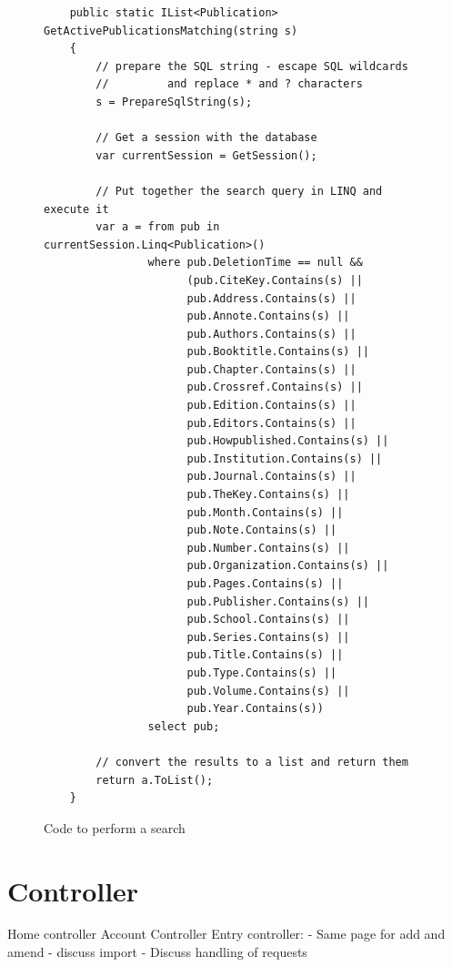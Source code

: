 \begin{figure}
	\begin{center}
			\lstset{language=CSharp} 
			\begin{lstlisting}
	public static IList<Publication> GetActivePublicationsMatching(string s)
	{
	    // prepare the SQL string - escape SQL wildcards 
	    //         and replace * and ? characters
	    s = PrepareSqlString(s);
	    
	    // Get a session with the database
	    var currentSession = GetSession();
	
	    // Put together the search query in LINQ and execute it
	    var a = from pub in currentSession.Linq<Publication>()
	            where pub.DeletionTime == null &&
	                  (pub.CiteKey.Contains(s) ||
	                  pub.Address.Contains(s) ||
	                  pub.Annote.Contains(s) ||
	                  pub.Authors.Contains(s) ||
	                  pub.Booktitle.Contains(s) ||
	                  pub.Chapter.Contains(s) ||
	                  pub.Crossref.Contains(s) ||
	                  pub.Edition.Contains(s) ||
	                  pub.Editors.Contains(s) ||
	                  pub.Howpublished.Contains(s) ||
	                  pub.Institution.Contains(s) ||
	                  pub.Journal.Contains(s) ||
	                  pub.TheKey.Contains(s) ||
	                  pub.Month.Contains(s) ||
	                  pub.Note.Contains(s) ||
	                  pub.Number.Contains(s) ||
	                  pub.Organization.Contains(s) ||
	                  pub.Pages.Contains(s) ||
	                  pub.Publisher.Contains(s) ||
	                  pub.School.Contains(s) ||
	                  pub.Series.Contains(s) ||
	                  pub.Title.Contains(s) ||
	                  pub.Type.Contains(s) ||
	                  pub.Volume.Contains(s) ||
	                  pub.Year.Contains(s))
	            select pub;
	
	    // convert the results to a list and return them
	    return a.ToList();
	}  		
			\end{lstlisting}
		\caption{Code to perform a search}
		\label{fig:PerformSearch}
	\end{center}
\end{figure}

\section{Controller}
Home controller
Account Controller
Entry controller:
 - Same page for add and amend
 - discuss import
 - 
Discuss handling of requests


